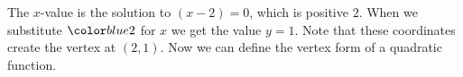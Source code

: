 \documentclass{ximera}
\begin{document}
      The $x$-value is the solution to $(x-2)=0$,
      which is positive $2$.
      When we substitute $\substitute{2}$ for $x$ we get the value $y=1$.
      Note that these coordinates create the vertex at $(2,1)$.
      Now we can define the vertex form of a quadratic function.


   

%
\end{document}
